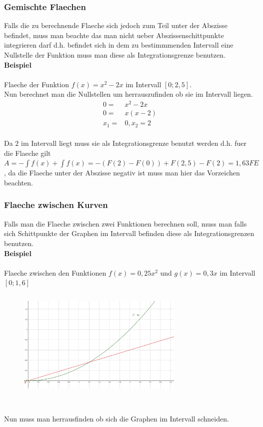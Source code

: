 \documentclass[a4paper]{article} %
\begin{document}
	\subsubsection{Gemischte Flaechen}
	Falls die zu berechnende Flaeche sich jedoch zum Teil unter der Abszisse befindet, muss man beachte das
	man nicht ueber Abszissenschittpunkte integrieren darf d.h. befindet sich in dem zu bestimmmenden Intervall eine
	Nullstelle der Funktion muss man diese als Integrationsgrenze benutzen.\\
	\textbf{Beispiel}\\\\
	Flaeche der Funktion $f(x)=x^2-2x$ im Intervall $[0;2,5]$.\\
	Nun berechnet man die Nullstellen um herrauszufinden ob sie im Intervall liegen.\\
	\begin{align*}
	0=&x^2-2x\\
	0=&x(x-2)\\
	x_1=&0,x_2=2
	\end{align*}\\
	Da $2$ im Intervall liegt muss sie als Integrationsgrenze benutzt werden d.h. fuer die Flaeche gilt
	$A=-\int f(x)+\int f(x)=-(F(2)-F(0))+F(2,5)-F(2)=1,63FE$, da die Flaeche unter der Abszisse negativ ist muss man hier das Vorzeichen beachten.\\
	\subsubsection{Flaeche zwischen Kurven}
	Falls man die Flaeche zwischen zwei Funktionen berechnen soll, muss man falls sich Schittpunkte der Graphen im Intervall befinden
	diese als Integrationsgrenzen benutzen.\\
	\textbf{Beispiel}\\\\
	Flaeche zwischen den Funktionen $f(x)=0,25x^2$ und $g(x)=0,3x$ im Intervall $[0;1,6]$\\
	\begin{minipage}{0.3\textwidth}
	\begin{figure}[H]
	\includegraphics[width=300px, height=200px]{Integral_2.png}
	\caption{}
	\end{figure}
	\end{minipage} \hfill
	\\Nun muss man herrausfinden ob sich die Graphen im Intervall schneiden.\\
\end{document}
